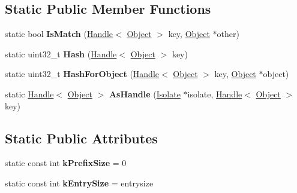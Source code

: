 \subsection*{Static Public Member Functions}
\begin{DoxyCompactItemize}
\item 
static bool {\bfseries Is\+Match} (\hyperlink{classv8_1_1internal_1_1_handle}{Handle}$<$ \hyperlink{classv8_1_1internal_1_1_object}{Object} $>$ key, \hyperlink{classv8_1_1internal_1_1_object}{Object} $\ast$other)\hypertarget{classv8_1_1internal_1_1_weak_hash_table_shape_ad64e199f5d82a7f407ce25469cf0ded1}{}\label{classv8_1_1internal_1_1_weak_hash_table_shape_ad64e199f5d82a7f407ce25469cf0ded1}

\item 
static uint32\+\_\+t {\bfseries Hash} (\hyperlink{classv8_1_1internal_1_1_handle}{Handle}$<$ \hyperlink{classv8_1_1internal_1_1_object}{Object} $>$ key)\hypertarget{classv8_1_1internal_1_1_weak_hash_table_shape_a0ce582647bdd7c4fbad02da93feb1cfe}{}\label{classv8_1_1internal_1_1_weak_hash_table_shape_a0ce582647bdd7c4fbad02da93feb1cfe}

\item 
static uint32\+\_\+t {\bfseries Hash\+For\+Object} (\hyperlink{classv8_1_1internal_1_1_handle}{Handle}$<$ \hyperlink{classv8_1_1internal_1_1_object}{Object} $>$ key, \hyperlink{classv8_1_1internal_1_1_object}{Object} $\ast$object)\hypertarget{classv8_1_1internal_1_1_weak_hash_table_shape_a52b01f4039764355ff27d945d6664a62}{}\label{classv8_1_1internal_1_1_weak_hash_table_shape_a52b01f4039764355ff27d945d6664a62}

\item 
static \hyperlink{classv8_1_1internal_1_1_handle}{Handle}$<$ \hyperlink{classv8_1_1internal_1_1_object}{Object} $>$ {\bfseries As\+Handle} (\hyperlink{classv8_1_1internal_1_1_isolate}{Isolate} $\ast$isolate, \hyperlink{classv8_1_1internal_1_1_handle}{Handle}$<$ \hyperlink{classv8_1_1internal_1_1_object}{Object} $>$ key)\hypertarget{classv8_1_1internal_1_1_weak_hash_table_shape_a1425bba45891c4279438964ed61b29bc}{}\label{classv8_1_1internal_1_1_weak_hash_table_shape_a1425bba45891c4279438964ed61b29bc}

\end{DoxyCompactItemize}
\subsection*{Static Public Attributes}
\begin{DoxyCompactItemize}
\item 
static const int {\bfseries k\+Prefix\+Size} = 0\hypertarget{classv8_1_1internal_1_1_weak_hash_table_shape_a06d4caf7eddf3598883ba5d38a5d3745}{}\label{classv8_1_1internal_1_1_weak_hash_table_shape_a06d4caf7eddf3598883ba5d38a5d3745}

\item 
static const int {\bfseries k\+Entry\+Size} = entrysize\hypertarget{classv8_1_1internal_1_1_weak_hash_table_shape_ac214dc6d720864e019a4fa4fdfeaf6c9}{}\label{classv8_1_1internal_1_1_weak_hash_table_shape_ac214dc6d720864e019a4fa4fdfeaf6c9}

\end{DoxyCompactItemize}


